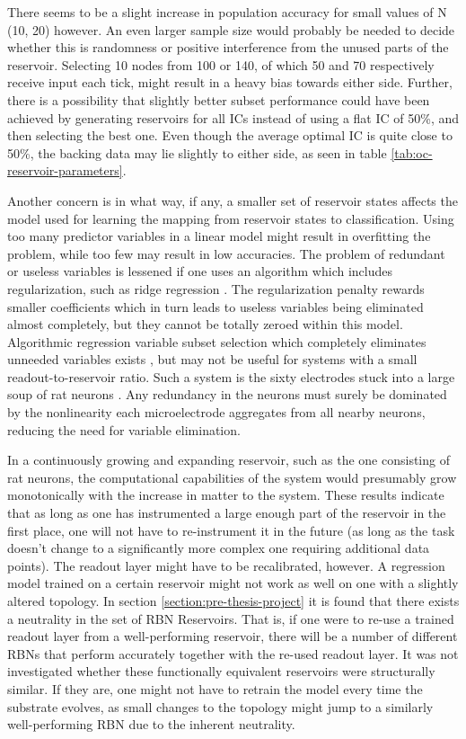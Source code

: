 There seems to be a slight increase in population accuracy for small values of N (10, 20) however.
An even larger sample size would probably be needed to decide whether this is randomness or positive interference from the unused parts of the reservoir.
Selecting 10 nodes from 100 or 140, of which 50 and 70 respectively receive input each tick, might result in a heavy bias towards either side.
Further, there is a possibility that slightly better subset performance could have been achieved by generating reservoirs for all ICs instead of using a flat IC of 50\%,
and then selecting the best one.
Even though the average optimal IC is quite close to 50\%,
the backing data may lie slightly to either side,
as seen in table \ref{tab:oc-reservoir-parameters}.

Another concern is in what way, if any, a smaller set of reservoir states affects the model used for learning the mapping from reservoir states to classification.
Using too many predictor variables in a linear model might result in overfitting the problem,
while too few may result in low accuracies.
The problem of redundant or useless variables is lessened if one uses an algorithm which includes regularization,
such as ridge regression \cite{hoerl1970ridge}.
The regularization penalty rewards smaller coefficients which in turn leads to useless variables being eliminated almost completely,
but they cannot be totally zeroed within this model.
Algorithmic regression variable subset selection which completely eliminates unneeded variables exists \cite{miller2002subset},
but may not be useful for systems with a small readout-to-reservoir ratio.
Such a system is the sixty electrodes stuck into a large soup of rat neurons \cite{demarse2005adaptive}.
Any redundancy in the neurons must surely be dominated by the nonlinearity each microelectrode aggregates from all nearby neurons,
reducing the need for variable elimination.

In a continuously growing and expanding reservoir,
such as the one consisting of rat neurons,
the computational capabilities of the system would presumably grow monotonically with the increase in matter to the system.
These results indicate that as long as one has instrumented a large enough part of the reservoir in the first place,
one will not have to re-instrument it in the future (as long as the task doesn't change to a significantly more complex one requiring additional data points).
The readout layer might have to be recalibrated, however.
A regression model trained on a certain reservoir might not work as well on one with a slightly altered topology.
In section \ref{section:pre-thesis-project} it is found that there exists a neutrality in the set of RBN Reservoirs.
That is, if one were to re-use a trained readout layer from a well-performing reservoir,
there will be a number of different RBNs that perform accurately together with the re-used readout layer.
It was not investigated whether these functionally equivalent reservoirs were structurally similar.
If they are, one might not have to retrain the model every time the substrate evolves,
as small changes to the topology might jump to a similarly well-performing RBN due to the inherent neutrality.
